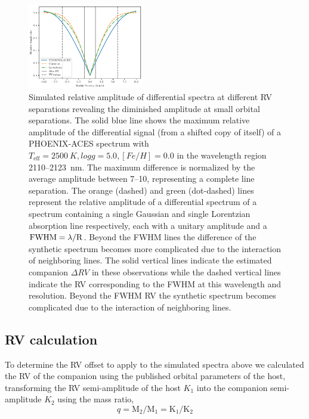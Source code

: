 \begin{figure}
	\includegraphics[width=0.45\textwidth]{figures/direct-recovery/rv_diff_final.pdf}
	\caption{Simulated relative amplitude of differential spectra at different RV separations revealing the diminished amplitude at small orbital separations. The solid blue line shows the maximum relative amplitude of the differential signal (from a shifted copy of itself) of a PHOENIX-ACES spectrum with \(T_{\textrm{eff}}=2500~K, logg=5.0, [Fe/H]=0.0\) in the wavelength region 2110--2123~nm. The maximum difference is normalized by the average amplitude between 7--10\kmps{}, representing a complete line separation. The orange (dashed) and green (dot-dashed) lines represent the relative amplitude of a differential spectrum of a spectrum containing a single Gaussian and single Lorentzian absorption line respectively, each with a unitary amplitude and a \(\rm FWHM = \lambda / R\). Beyond the FWHM lines the difference of the synthetic spectrum becomes more complicated due to the interaction of neighboring lines. The solid vertical lines indicate the estimated companion \(\Delta RV\) in these observations while the dashed vertical lines indicate the RV corresponding to the FWHM at this wavelength and resolution. Beyond the FWHM RV the synthetic spectrum becomes complicated due to the interaction of neighboring lines.}

	\label{fig:diff_amp}
\end{figure}


\subsection{RV calculation}
To determine the RV offset to apply to the simulated spectra above we calculated the RV of the companion using the published orbital parameters of the host, transforming the RV semi-amplitude of the host \(K_{1} \) into the companion semi-amplitude \(K_{2} \) using the mass ratio,
\begin{equation}
\label{eqn:mass_ratio}
q = \textrm{M}_{2} / \textrm{M}_{1} = \textrm{K}_{1} / \textrm{K}_{2}
\end{equation}

